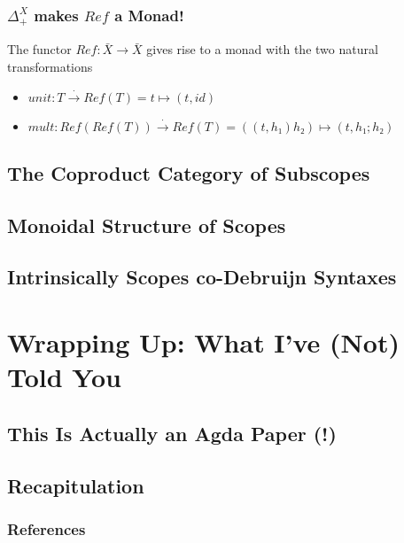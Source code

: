 \documentclass[aspectratio=169]{beamer}
\theoremstyle{remarkstyle}
\begin{document}
\begin{frame}[fragile]
  \frametitle{$Δ_+^X$ makes $Ref$ a Monad!}
  \begin{theorem}
    The functor $Ref : \bar{X} → \bar{X}$ gives rise to a monad with the two natural transformations
    \begin{itemize}
      \item $unit : T \stackrel{⋅}{→} Ref(T) = t ↦ (t, id)$ 
      \item $mult : Ref(Ref(T)) \stackrel{⋅}{→} Ref(T) = ((t, h₁) h₂) ↦ (t, h₁;h₂)$
    \end{itemize}
  \end{theorem}
  \begin{example}
  \end{example}
\end{frame}

\subsection{The Coproduct Category of Subscopes}

\subsection{Monoidal Structure of Scopes}
\subsection{Intrinsically Scopes co-Debruijn Syntaxes}
\section{Wrapping Up: What I've (Not) Told You}
\subsection{This Is Actually an Agda Paper (!)}
\subsection{Recapitulation}

\begin{frame}[fragile]
  \frametitle{References}
  \nocite{catsandtypes}
  \printbibliography{}
\end{frame}
\end{document}
